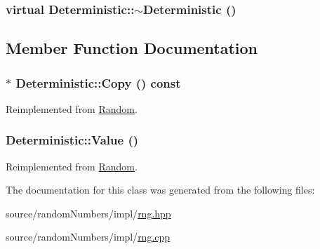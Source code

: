 \hypertarget{classDeterministic_b14fdbe43ddacba07192a79b35bc76f7}{
\subsubsection[{$\sim$Deterministic}]{\setlength{\rightskip}{0pt plus 5cm}virtual Deterministic::$\sim$Deterministic ()}}
\label{classDeterministic_b14fdbe43ddacba07192a79b35bc76f7}




\subsection{Member Function Documentation}
\hypertarget{classDeterministic_4eb4260ecbc55661f1d9c268e6684ea4}{
\subsubsection[{Copy}]{ $\ast$ Deterministic::Copy () const}}
\label{classDeterministic_4eb4260ecbc55661f1d9c268e6684ea4}




Reimplemented from \hyperlink{classRandom_22b2951acd2008e8ff58fae434ab7ac5}{Random}.\hypertarget{classDeterministic_5bca3d51cb08d3ec23579e09ce8e713f}{
\subsubsection[{Value}]{ Deterministic::Value ()}}
\label{classDeterministic_5bca3d51cb08d3ec23579e09ce8e713f}




Reimplemented from \hyperlink{classRandom_4d1c2876c5c78104186e241209d0e11e}{Random}.

The documentation for this class was generated from the following files:\begin{CompactItemize}
\item 
source/randomNumbers/impl/\hyperlink{rng_8hpp}{rng.hpp}\item 
source/randomNumbers/impl/\hyperlink{rng_8cpp}{rng.cpp}\end{CompactItemize}
